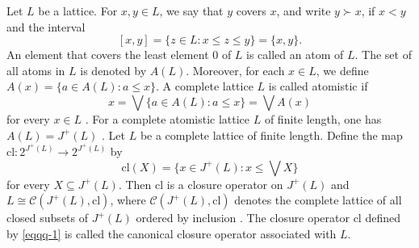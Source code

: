 \documentclass[12pt]{article}
\begin{document}
Let $L$ be a lattice. For $x, y\in L$, we say that $y$ covers $x$, 
and write $y\succ x$, if $x< y$ and the interval 
$$[x, y]=\{z\in L: x\leq z\leq y\}=\{x,y\}.$$ 
An element that covers the least element $0$ of $L$ is 
called an atom of $L$. The set of all atoms in $L$ is denoted by $A(L)$. 
Moreover, for each $x\in L$, we define $A(x)=\{a\in A(L): a\leq x\}$.
A complete lattice $L$ is called atomistic 
if $$x=\bigvee\{a\in A(L): a\leq x\}=\bigvee A(x)$$ 
for every $x\in L$ \cite{Crawley73}. For a complete atomistic 
lattice $L$ of finite length, 
one has $A(L)=J^{+}(L)$ \cite{Birkhoff73, Davey}. 
Let $L$ be a complete lattice of finite length. 
Define the map $\mbox{cl}: 2^{J^{+}(L)}\longrightarrow 2^{J^{+}(L)}$ by
\begin{equation}\label{eqqq-1}
\mbox{cl}(X)=\{x\in J^{+}(L): x\leq \bigvee X\}
\end{equation}
for every $X\subseteq J^{+}(L)$. Then $\mbox{cl}$ is a closure 
operator on $J^{+}(L)$ and $L\cong \mathcal{C}(J^{+}(L), \mbox{cl})$, 
where $\mathcal{C}(J^{+}(L), \mbox{cl})$ denotes the complete lattice 
of all closed subsets of $J^{+}(L)$ ordered by 
inclusion \cite{Nation, Davey}. The closure operator $\mbox{cl}$ defined by \eqref{eqqq-1} is called the canonical closure operator associated with $L$. 
\end{document}
